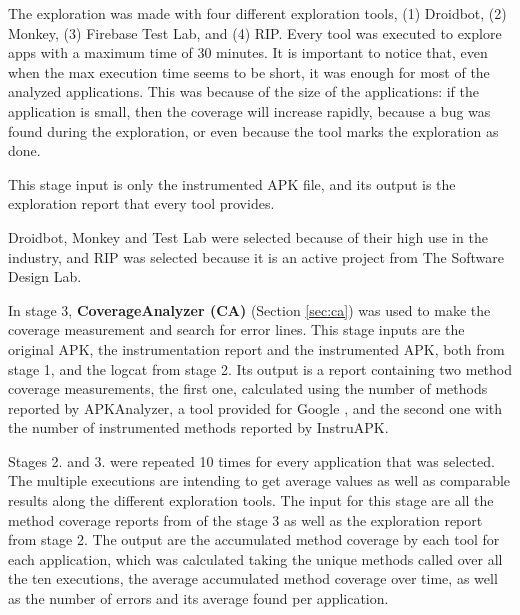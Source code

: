 The exploration was made with four different exploration tools, (1) Droidbot, (2) Monkey, (3) Firebase Test Lab, and (4) RIP.  Every tool was executed to explore  apps with a maximum time of 30 minutes. It is important to notice that, even when the max execution time seems to be short, it was enough for most of the analyzed applications. This was because of the size of the applications: if the application is small, then the coverage will increase rapidly, because a bug was found during the exploration, or even because the tool marks the exploration as done. 

This stage input is only the instrumented APK file, and its output is the exploration report that every tool provides. 
 

Droidbot, Monkey and Test Lab were selected because of their high use in the industry, and RIP was selected because it is an active project from The Software Design Lab. 

In stage 3, \textbf{CoverageAnalyzer (CA)} (Section \ref{sec:ca}) was used to make the coverage measurement and search for error lines. This stage inputs are the original APK, the instrumentation report and the instrumented APK, both from stage 1, and the logcat from stage 2. Its output is a report containing two method coverage measurements, the first one, calculated using the number of methods reported by APKAnalyzer, a tool provided for Google , and the second one with the number of instrumented methods reported by InstruAPK.


Stages 2. and 3. were repeated 10 times for every application that was selected. The multiple executions are intending to get average values as well as comparable results along the different exploration tools. The input for this stage   are all the method coverage reports from of the stage 3 as well as the exploration report from stage 2. The output are the accumulated method coverage by each tool for each application, which was calculated taking the unique methods called over all the ten executions, the average accumulated method coverage over time, as well as the number of errors and its average found per application.

